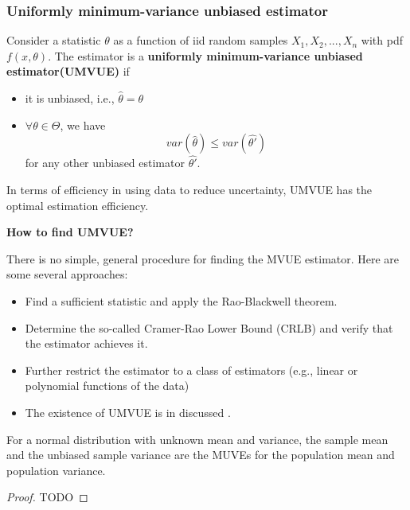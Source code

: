 \begin{refsection}
\subsubsection{Uniformly minimum-variance unbiased estimator}
\begin{definition}
	Consider a statistic $\theta$ as a function of iid random samples $X_1,X_2,...,X_n$ with pdf $f(x,\theta)$. The estimator is a \textbf{uniformly minimum-variance unbiased estimator(UMVUE)} if 
	\begin{itemize}
		\item it is unbiased, i.e., $\hat{\theta} = \theta$
		\item $\forall \theta \in \Theta$, we have $$var(\hat{\theta}) \leq var(\hat{\theta'})$$ for any other unbiased estimator $\hat{\theta'}$.
	\end{itemize}
\end{definition}

\begin{remark} [interpretation]
	In terms of efficiency in using data to reduce uncertainty, UMVUE has the optimal estimation efficiency.
\end{remark}

\begin{mdframed}
	\textbf{How to find UMVUE?}
	
	There is no simple, general procedure for finding the MVUE
	estimator. Here are some several
	approaches:
	\begin{itemize}
		\item Find a sufficient statistic and apply the Rao-Blackwell theorem.
		\item Determine the so-called Cramer-Rao Lower Bound (CRLB)
		and verify that the estimator achieves it.
		\item Further restrict the estimator to a class of estimators (e.g.,
		linear or polynomial functions of the data)
		\item The existence of UMVUE is in discussed \cite[62]{keener2010theoretical}.
	\end{itemize}
\end{mdframed}



\begin{lemma}
	For a normal distribution with unknown mean and variance, the sample mean and the unbiased sample variance are the MUVEs for the population mean and population variance.
\end{lemma}
\begin{proof}
	TODO
	

\end{proof}
\end{refsection}
